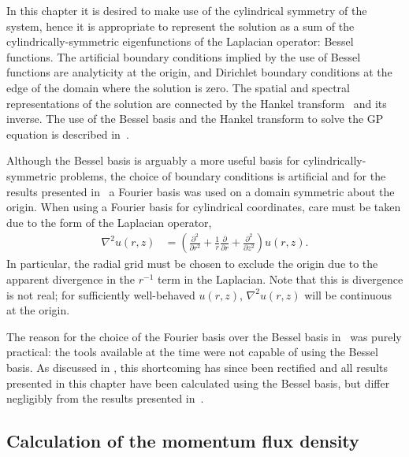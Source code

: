 In this chapter it is desired to make use of the cylindrical symmetry of the system, hence it is appropriate to represent the solution as a sum of the cylindrically-symmetric eigenfunctions of the Laplacian operator: Bessel functions. The artificial boundary conditions implied by the use of Bessel functions are analyticity at the origin, and Dirichlet boundary conditions at the edge of the domain where the solution is zero. The spatial and spectral representations of the solution are connected by the Hankel transform~\citep[Chapter 15]{ArfkenWeber} and its inverse. The use of the Bessel basis and the Hankel transform to solve the GP equation is described in~\citep{Ronen:2006}.

Although the Bessel basis is arguably a more useful basis for cylindrically-symmetric problems, the choice of boundary conditions is artificial and for the results presented in~\citep{Dall:2009} a Fourier basis was used on a domain symmetric about the origin. When using a Fourier basis for cylindrical coordinates, care must be taken due to the form of the Laplacian operator,
\begin{align}
    \nabla^2 u(r, z) &= \left(\frac{\partial^2 }{\partial r^2} + \frac{1}{r}\frac{\partial }{\partial r} + \frac{\partial^2 }{\partial z^2}\right)u(r, z).
\end{align}
In particular, the radial grid must be chosen to exclude the origin due to the apparent divergence in the $r^{-1}$ term in the Laplacian. Note that this is divergence is not real; for sufficiently well-behaved $u(r, z)$, $\nabla^2 u(r, z)$ will be continuous at the origin.

The reason for the choice of the Fourier basis over the Bessel basis in~\citep{Dall:2009} was purely practical: the tools available at the time were not capable of using the Bessel basis. As discussed in , this shortcoming has since been rectified and all results presented in this chapter have been calculated using the Bessel basis, but differ negligibly from the results presented in~\citep{Dall:2009}.

\subsection{Calculation of the momentum flux density}
\label{Peaks:AbsorbingBoundaryTricks}

